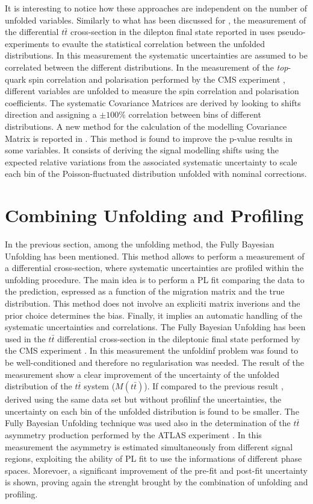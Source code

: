 \documentclass[12pt]{article}
\begin{document}
It is interesting to notice how these approaches are independent on the number of unfolded variables.
Similarly to what has been discussed for \cite{atlas_diffrential}, the measurement of the differential $t\bar{t}$ cross-section in the dilepton final state reported in \cite{atlas_diff_dilep} uses pseudo-experiments to evaulte the statistical correlation between the unfolded distributions. In this measurement the systematic uncertainties are assumed to be correlated between the different distributions. 
In the measurement of the \emph{top}-quark spin correlation and polarisation performed by the CMS experiment \cite{PhysRevD.100.072002}, different variables are unfolded to measure the spin correlation and polarisation coefficients. The systematic Covariance Matrices are derived by looking to shifts direction and assigning a $\pm100\%$ correlation between bins of different distributions.
A new method for the calculation of the modelling Covariance Matrix is reported in \cite{allhad_atlas}. This method is found to improve the p-value results in some variables. It consists of deriving the signal modelling shifts using the expected relative variations from the associated systematic uncertainty to scale each bin of the Poisson-fluctuated distribution unfolded with nominal corrections.

\section{Combining Unfolding and Profiling}
In the previous section, among the unfolding method, the Fully Bayesian Unfolding has been mentioned. This method allows to perform a measurement of a differential cross-section, where systematic uncertainties are profiled within the unfolding procedure. 
The main idea is to perform a PL fit comparing the data to the prediction, espressed as a function of the migration matrix and the true distribution. This method does not involve an expliciti matrix inverions and the prior choice determines the bias. Finally, it implies an automatic handling of the systematic uncertainties and correlations.
The Fully Bayesian Unfolding has been used in the $t\bar{t}$ differential cross-section in the dileptonic final state performed by the CMS experiment \cite{2020135263}. In this measurement the unfoldinf problem was found to be well-conditioned and therefore no regularisation was needed. 
The result of the measurement show a clear improvement of the uncertainty of the unfolded distribution of the $t\bar{t}$ system ($M(t\bar{t})$). If compared to the previous result \cite{CMS_diff_to_compare}, derived using the same data set but without profilinf the uncertainties, the uncertainty on each bin of the unfolded distribution is found to be smaller.
The Fully Bayesian Unfolding technique was used also in the determination of the $t\bar{t}$ asymmetry production performed by the ATLAS experiment \cite{ATLAS-CONF-2019-026}. In this measurement the asymmetry is estimated simultaneously from different signal regions, exploiting the ability of PL fit to use the informations of different phase spaces. Morevoer, a significant improvement of the pre-fit and post-fit uncertainty is shown, proving again the strenght brought by the combination of unfolding and profiling. 
\end{document}
